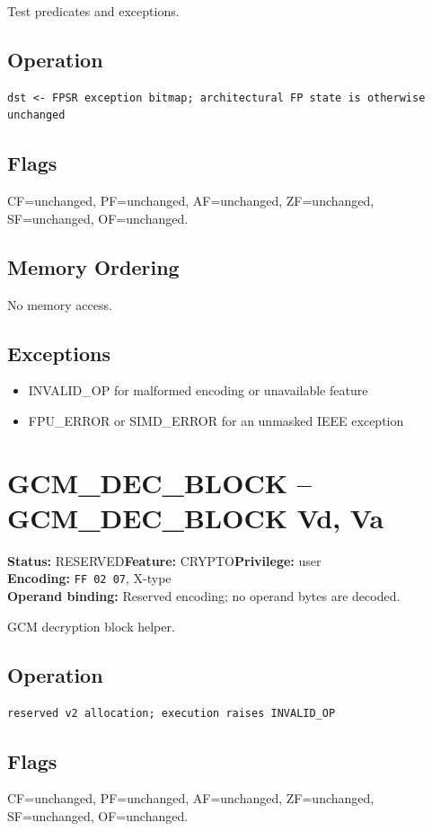 \documentclass[10pt]{article}
\begin{document}
Test predicates and exceptions.

\subsection*{Operation}
\begin{lstlisting}
dst <- FPSR exception bitmap; architectural FP state is otherwise unchanged
\end{lstlisting}
\subsection*{Flags}
CF=unchanged, PF=unchanged, AF=unchanged, ZF=unchanged, SF=unchanged, OF=unchanged.
\subsection*{Memory Ordering}
No memory access.
\subsection*{Exceptions}
\begin{itemize}
\item INVALID\_OP for malformed encoding or unavailable feature
\item FPU\_ERROR or SIMD\_ERROR for an unmasked IEEE exception
\end{itemize}
\clearpage

\section{GCM\_DEC\_BLOCK -- GCM\_DEC\_BLOCK Vd, Va}
\textbf{Status:} RESERVED\quad \textbf{Feature:} CRYPTO\quad \textbf{Privilege:} user\\
\textbf{Encoding:} \texttt{FF 02 07}, X-type\\
\textbf{Operand binding:} Reserved encoding; no operand bytes are decoded.

GCM decryption block helper.

\subsection*{Operation}
\begin{lstlisting}
reserved v2 allocation; execution raises INVALID_OP
\end{lstlisting}
\subsection*{Flags}
CF=unchanged, PF=unchanged, AF=unchanged, ZF=unchanged, SF=unchanged, OF=unchanged.
\end{document}
